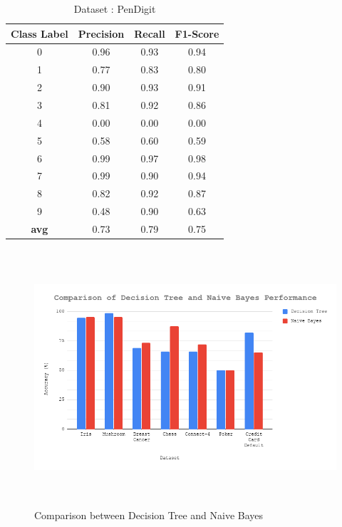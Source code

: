 \documentclass[12pt]{article}
\begin{document}
\begin{table}[H]
	\caption{Dataset : PenDigit}
	\centering
	\begin{tabular}{|c|c|c|c|}
		\hline
		\textbf{Class Label} & \textbf{Precision} & \textbf{Recall} & \textbf{F1-Score} \\ \hline
		0                    & 0.96               & 0.93            & 0.94              \\ \hline
		1                    & 0.77               & 0.83            & 0.80              \\ \hline
		2                    & 0.90               & 0.93            & 0.91              \\ \hline
		3                    & 0.81               & 0.92            & 0.86              \\ \hline
		4                    & 0.00               & 0.00            & 0.00              \\ \hline
		5                    & 0.58               & 0.60            & 0.59              \\ \hline
		6                    & 0.99               & 0.97            & 0.98              \\ \hline
		7                    & 0.99               & 0.90            & 0.94              \\ \hline
		8                    & 0.82               & 0.92            & 0.87              \\ \hline
		9                    & 0.48               & 0.90            & 0.63              \\ \hline
		\textbf{avg}         & 0.73               & 0.79            & 0.75              \\ \hline
	\end{tabular}
\end{table}


\begin{figure}[H]
	\centering
	\includegraphics[width = \columnwidth, height = 9.5cm]{Comparison.png}
	\caption{Comparison between Decision Tree and Naive Bayes}
	\label{fig:comparison}
\end{figure}
\end{document}
